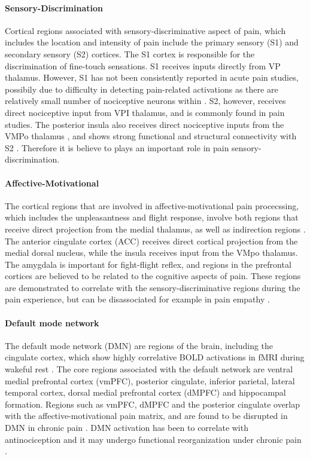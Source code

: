 \paragraph{Sensory-Discrimination}
Cortical regions associated with sensory-discriminative aspect of pain, which includes the location and intensity of pain include the primary sensory (S1) and secondary sensory (S2) cortices. The S1 cortex is responsible for the discrimination of fine-touch sensations. S1 receives inputs directly from VP thalamus. However, S1 has not been consistently reported in acute pain studies, possibily due to difficulty in detecting pain-related activations as there are relatively small number of nociceptive neurons within \cite{bushnell1999pain}. S2, however, receives direct nociceptive input from VPI thalamus, and is commonly found in pain studies. The posterior insula also receives direct nociceptive inputs from the VMPo thalamus \cite{Craig2003}, and shows strong functional and structural connectivity with S2 \cite{Wiech2014}. Therefore it is believe to plays an important role in pain sensory-discrimination. 

\paragraph{Affective-Motivational}
The cortical regions that are involved in affective-motivational pain procecssing, which includes the unpleasantness and flight response, involve both regions that receive direct projection from the medial thalamus, as well as indirection regions . The anterior cingulate cortex (ACC) receives direct cortical projection from the medial dorsal nucleus, while the insula receives input from the VMpo thalamus. The amygdala is important for fight-flight reflex, and regions in the prefrontal cortices are believed to be related to the cognitive aspects of pain. These regions are demonstrated to correlate with the sensory-discriminative regions during the pain experience, but can be disassociated for example in pain empathy \cite{Singer2004}. 

\paragraph{Default mode network}
The default mode network (DMN) are regions of the brain, including the cingulate cortex, which show highly correlative BOLD activations in fMRI during wakeful rest \cite{Greicius2003,Raichle2015}. The core regions associated with the default network are ventral medial prefrontal cortex (vmPFC), posterior cingulate, inferior parietal, lateral temporal cortex, dorsal medial prefrontal cortex (dMPFC) and hippocampal formation. Regions such as vmPFC, dMPFC and the posterior cingulate overlap with the affective-motivational pain matrix, and are found to be disrupted in DMN in chronic pain \cite{Baliki2008}. DMN activation has been to correlate with antinociception \cite{Kucyi2013} and it may undergo functional reorganization under chronic pain \cite{Baliki2014}. 

